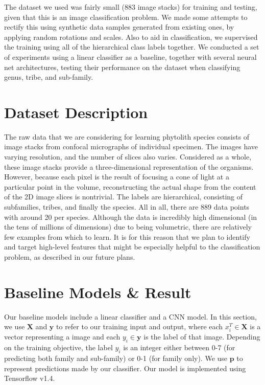\documentclass{article}
\begin{document}
The dataset we used was fairly small (883 image stacks) for training and testing, given that this is an image classification problem. We made some attempts to rectify this using synthetic data samples generated from existing ones, by applying random rotations and scales. Also to aid in classification, we supervised the training using all of the hierarchical class labels together. We conducted a set of experiments using a linear classifier as a baseline, together with several neural net architectures, testing their performance on the dataset when classifying genus, tribe, and sub-family.

\section{Dataset Description}

The raw data that we are considering for learning phytolith species consists of image stacks from confocal micrographs of individual specimen. The images have varying resolution, and the number of slices also varies. Considered as a whole, these image stacks provide a three-dimensional representation of the organisms. However, because each pixel is the result of focusing a cone of light at a particular point in the volume, reconstructing the actual shape from the content of the 2D image slices is nontrivial.
The labels are hierarchical, consisting of subfamilies, tribes, and finally the species. All in all, there are 889 data points with around 20 per species. Although the data is incredibly high dimensional (in the tens of millions of dimensions) due to being volumetric, there are relatively few examples from which to learn. It is for this reason that we plan to identify and target high-level features that might be especially helpful to the classification problem, as described in our future plans.


\section{Baseline Models \& Result}

Our baseline models include a linear classifier and a CNN model. In this section, we use $\mathbf{X}$ and $\mathbf{y}$ to refer to our training input and output, where each ${x}_i^T\in \mathbf{X}$ is a vector representing a image and each ${y_i}\in \mathbf{y}$ is the label of that image. Depending on the training objective, the label $y_i$ is an integer either between 0-7 (for predicting both family and sub-family) or 0-1 (for family only). We use $\mathbf{p}$ to represent predictions made by our classifier. Our model is implemented using Tensorflow v1.4.
\end{document}
